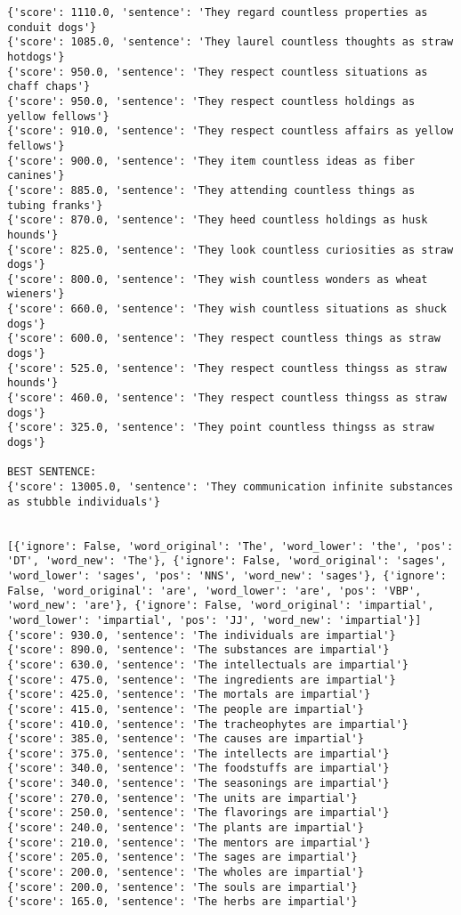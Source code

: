 \documentclass[12pt,a4paper,oneside]{book}
\begin{document}
\begin{verbatim}
{'score': 1110.0, 'sentence': 'They regard countless properties as conduit dogs'}
{'score': 1085.0, 'sentence': 'They laurel countless thoughts as straw hotdogs'}
{'score': 950.0, 'sentence': 'They respect countless situations as chaff chaps'}
{'score': 950.0, 'sentence': 'They respect countless holdings as yellow fellows'}
{'score': 910.0, 'sentence': 'They respect countless affairs as yellow fellows'}
{'score': 900.0, 'sentence': 'They item countless ideas as fiber canines'}
{'score': 885.0, 'sentence': 'They attending countless things as tubing franks'}
{'score': 870.0, 'sentence': 'They heed countless holdings as husk hounds'}
{'score': 825.0, 'sentence': 'They look countless curiosities as straw dogs'}
{'score': 800.0, 'sentence': 'They wish countless wonders as wheat wieners'}
{'score': 660.0, 'sentence': 'They wish countless situations as shuck dogs'}
{'score': 600.0, 'sentence': 'They respect countless things as straw dogs'}
{'score': 525.0, 'sentence': 'They respect countless thingss as straw hounds'}
{'score': 460.0, 'sentence': 'They respect countless thingss as straw dogs'}
{'score': 325.0, 'sentence': 'They point countless thingss as straw dogs'}

BEST SENTENCE:
{'score': 13005.0, 'sentence': 'They communication infinite substances as stubble individuals'}


[{'ignore': False, 'word_original': 'The', 'word_lower': 'the', 'pos': 'DT', 'word_new': 'The'}, {'ignore': False, 'word_original': 'sages', 'word_lower': 'sages', 'pos': 'NNS', 'word_new': 'sages'}, {'ignore': False, 'word_original': 'are', 'word_lower': 'are', 'pos': 'VBP', 'word_new': 'are'}, {'ignore': False, 'word_original': 'impartial', 'word_lower': 'impartial', 'pos': 'JJ', 'word_new': 'impartial'}]
{'score': 930.0, 'sentence': 'The individuals are impartial'}
{'score': 890.0, 'sentence': 'The substances are impartial'}
{'score': 630.0, 'sentence': 'The intellectuals are impartial'}
{'score': 475.0, 'sentence': 'The ingredients are impartial'}
{'score': 425.0, 'sentence': 'The mortals are impartial'}
{'score': 415.0, 'sentence': 'The people are impartial'}
{'score': 410.0, 'sentence': 'The tracheophytes are impartial'}
{'score': 385.0, 'sentence': 'The causes are impartial'}
{'score': 375.0, 'sentence': 'The intellects are impartial'}
{'score': 340.0, 'sentence': 'The foodstuffs are impartial'}
{'score': 340.0, 'sentence': 'The seasonings are impartial'}
{'score': 270.0, 'sentence': 'The units are impartial'}
{'score': 250.0, 'sentence': 'The flavorings are impartial'}
{'score': 240.0, 'sentence': 'The plants are impartial'}
{'score': 210.0, 'sentence': 'The mentors are impartial'}
{'score': 205.0, 'sentence': 'The sages are impartial'}
{'score': 200.0, 'sentence': 'The wholes are impartial'}
{'score': 200.0, 'sentence': 'The souls are impartial'}
{'score': 165.0, 'sentence': 'The herbs are impartial'}


\end{verbatim}
\end{document}
